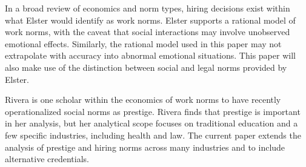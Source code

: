 \documentclass[review]{elsarticle}
\begin{document}

In a broad review of economics and norm types, hiring decisions exist within what Elster would identify as work norms\cite{elster1989social}.
Elster supports a rational model of work norms, with the caveat that social interactions may involve unobserved emotional effects.
Similarly, the rational model used in this paper may not extrapolate with accuracy into abnormal emotional situations.
This paper will also make use of the distinction between social and legal norms provided by Elster.

Rivera is one scholar within the economics of work norms to have recently operationalized social norms as prestige\cite{rivera2016pedigree}.
Rivera finds that prestige is important in her analysis, but her analytical scope focuses on traditional education and a few specific industries, including health and law.
The current paper extends the analysis of prestige and hiring norms
across many industries and to include alternative credentials.

\end{document}
